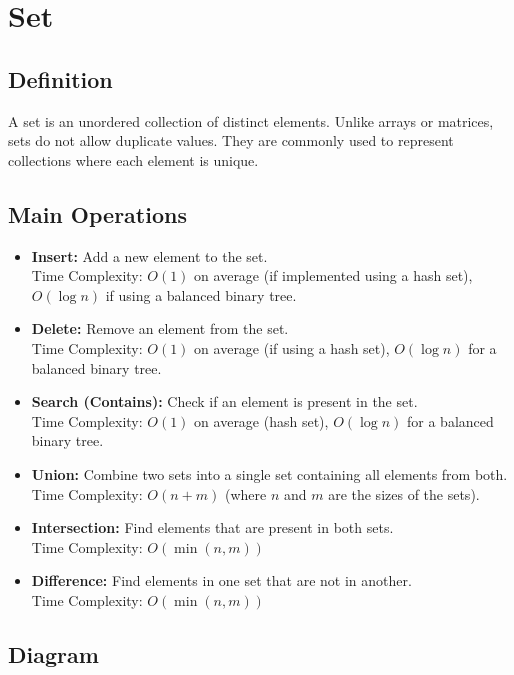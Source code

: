 \documentclass{article}
\begin{document}
\newpage

\section{Set}

\subsection{Definition}
A set is an unordered collection of distinct elements. Unlike arrays or matrices, sets do not allow duplicate values. They are commonly used to represent collections where each element is unique.

\subsection{Main Operations}
\begin{itemize}
    \item \textbf{Insert:} Add a new element to the set.\\
    Time Complexity: $O(1)$ on average (if implemented using a hash set), $O(\log n)$ if using a balanced binary tree.
    
    \item \textbf{Delete:} Remove an element from the set.\\
    Time Complexity: $O(1)$ on average (if using a hash set), $O(\log n)$ for a balanced binary tree.
    
    \item \textbf{Search (Contains):} Check if an element is present in the set.\\
    Time Complexity: $O(1)$ on average (hash set), $O(\log n)$ for a balanced binary tree.
    
    \item \textbf{Union:} Combine two sets into a single set containing all elements from both.\\
    Time Complexity: $O(n + m)$ (where $n$ and $m$ are the sizes of the sets).
    
    \item \textbf{Intersection:} Find elements that are present in both sets.\\
    Time Complexity: $O(\min(n, m))$
    
    \item \textbf{Difference:} Find elements in one set that are not in another.\\
    Time Complexity: $O(\min(n, m))$
\end{itemize}

\subsection{Diagram}
\begin{center}
\end{center}
\end{document}

